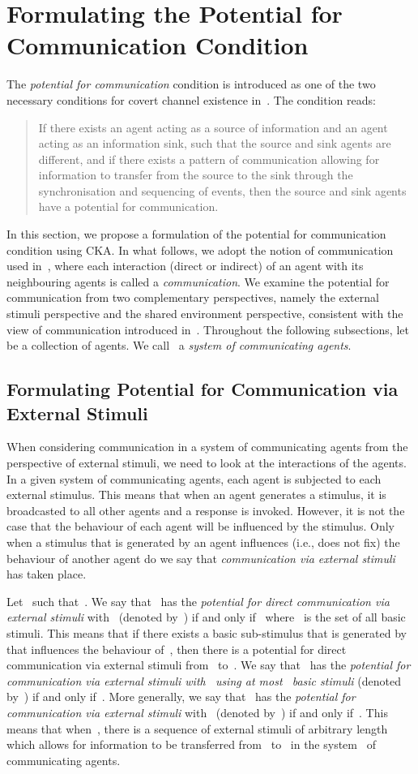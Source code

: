 \documentclass[copyright,creativecommons]{eptcs}
\makeatletter
\newcommand{\ie}{\textrm{i.e.,}\@\xspace}
\newcommand{\PFCemph}{\emph{potential for communication}\@\xspace}
\newcommand{\PFC}{potential for communication\@\xspace}
\newcommand{\PFCD}{potential for direct communication\@\xspace}
\newcommand{\soca}{system of communicating agents\@\xspace}
\newcommand{\socaC}{system~ of communicating agents\@\xspace}
\newcommand{\CCKAabbrv}{CKA\@\xspace}
\makeatother
\begin{document}
%
 

\section{Formulating the Potential for Communication Condition}
\label{sec:formulating_the_potential_for_communication_condition}
The \PFCemph condition is introduced as one of the two necessary conditions for covert channel existence in~\cite{Jaskolka2012aa}. 
The condition reads:
\begin{quote}
	If there exists an agent acting as a source of information and an agent acting as an information sink, such that the source and sink agents are different, and if there exists a pattern of communication allowing for information to transfer from the source to the sink through the synchronisation and sequencing of events, then the source and sink agents have a \PFC.
\end{quote}
In this section, we propose a formulation of the \PFC condition using \CCKAabbrv. In what follows, we adopt the notion of communication used in~\cite{Milner1989aa}, where each interaction (direct or indirect) of an agent with its neighbouring agents is called a \emph{communication}. We examine the \PFC from two complementary perspectives, namely the external stimuli perspective and the shared environment perspective, consistent with the view of communication introduced in~\cite{Jaskolka2013aa,Jaskolka2014aa}. Throughout the following subsections, let~ be a collection of agents. We call~ a \emph{\soca}. 


\subsection{Formulating Potential for Communication via External Stimuli}
\label{sub:potential_for_communication_via_external_stimuli}


When considering communication in a \soca from the perspective of external stimuli, we need to look at the interactions of the agents. In a given \soca, each agent is subjected to each external stimulus. This means that when an agent generates a stimulus, it is broadcasted to all other agents and a response is invoked. However, it is not the case that the behaviour of each agent will be influenced by the stimulus. Only when a stimulus that is generated by an agent influences  (\ie does not fix) the behaviour of another agent do we say that \emph{communication via external stimuli} has taken place. 

Let~ such that~. We say that~ has the \emph{\PFCD via external stimuli} with~ (denoted by~) if and only if~ where~ is the set of all basic stimuli. This means that if there exists a basic sub-stimulus that is generated by~ that influences the behaviour of~, then there is a \PFCD via external stimuli from~ to~. We say that~ has the \emph{\PFC via external stimuli with~ using at most~ basic stimuli} (denoted by~) if and only if~. More generally, we say that~ has the \emph{\PFC via external stimuli} with~ (denoted by~) if and only if~. This means that when~, there is a sequence of external stimuli of arbitrary length which allows for information to be transferred from~ to~ in the \socaC.
\end{document}
